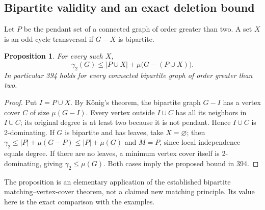 \documentclass[11pt,a4paper]{article}
\newtheorem{proposition}[theorem]{Proposition}
\theoremstyle{definition}\newtheorem{definition}[theorem]{Definition}
\theoremstyle{remark}\newtheorem{remark}[theorem]{Remark}
\begin{document}
\subsection{Bipartite validity and an exact deletion bound}
Let $P$ be the pendant set of a connected graph of order greater than
two. A set $X$ is an odd-cycle transversal if $G-X$ is bipartite.

\begin{proposition}\label{r11td:oct}
For every such $X$,
\[
 \gamma_2(G)\le |P\cup X|+\mu\bigl(G-(P\cup X)\bigr).
\]
In particular 394 holds for every connected bipartite graph of order
greater than two.
\end{proposition}
\begin{proof}
Put $I=P\cup X$. By K\"onig's theorem, the bipartite graph $G-I$
has a vertex cover $C$ of size $\mu(G-I)$. Every vertex outside
$I\cup C$ has all its neighbors in $I\cup C$; its original degree
is at least two because it is not pendant. Hence $I\cup C$ is
2-dominating. If $G$ is bipartite and has leaves, take $X=\varnothing$;
then $\gamma_2\le|P|+\mu(G-P)\le|P|+\mu(G)$ and $M=P$, since
local independence equals degree. If there are no leaves, a minimum
vertex cover itself is 2-dominating, giving $\gamma_2\le\mu(G)$.
Both cases imply the proposed bound in 394.
\end{proof}
The proposition is an elementary application of the established
bipartite matching--vertex-cover theorem, not a claimed new matching
principle. Its value here is the exact comparison with the examples.
\end{document}
